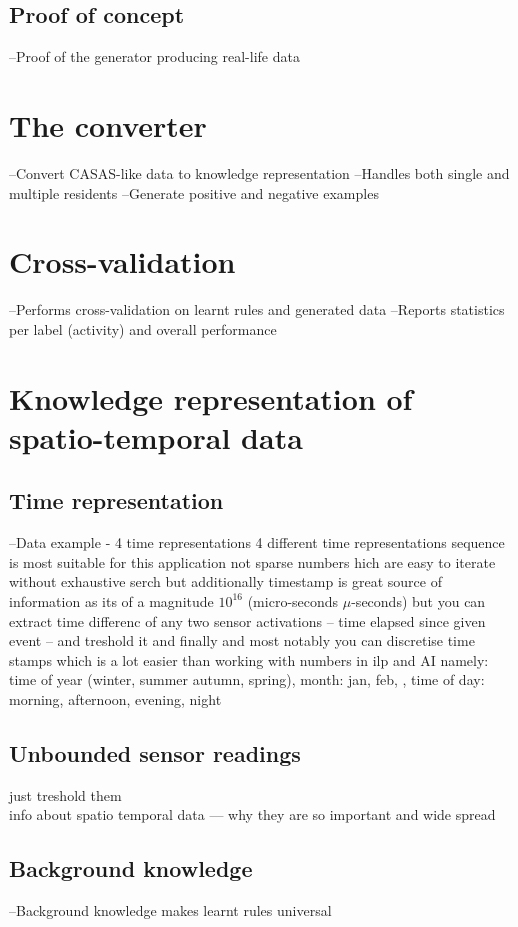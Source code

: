 \documentclass[12pt, a4paper, pdflatex, leqno, twoside, openright]{report}
\begin{document}
    \subsection{Proof of concept}
--Proof of the generator producing real-life data

  \section{The converter}
--Convert CASAS-like data to knowledge representation
--Handles both single and multiple residents
--Generate positive and negative examples

  \section{Cross-validation}
--Performs cross-validation on learnt rules and generated data
--Reports statistics per label (activity) and overall performance

  \section{Knowledge representation of spatio-temporal data}
    \subsection{Time representation}
--Data example - 4 time representations
4 different time representations
sequence is most suitable for this application
not sparse numbers hich are easy to iterate without exhaustive serch
but additionally timestamp is great source of information
as its of a magnitude $10^{16}$ (micro-seconds $\mu$-seconds)
but you can extract time differenc of any two sensor activations -- time elapsed since given event -- and treshold it
and finally and most notably you can discretise time stamps which is a lot easier than working with numbers in ilp and AI namely:
  time of year (winter, summer autumn, spring), month: jan, feb, , time of day: morning, afternoon, evening, night

    \subsection{Unbounded sensor readings}
just treshold them\\
info about spatio temporal data --- why they are so important and wide spread\\

    \subsection{Background knowledge}
--Background knowledge makes learnt rules universal
\end{document}
